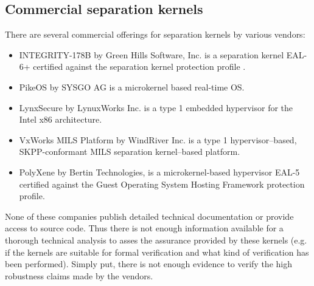 \subsection{Commercial separation kernels}\label{subsec:commercial-sks}
There are several commercial offerings for separation kernels by various
vendors:

\begin{itemize}
	\item INTEGRITY-178B by Green Hills Software, Inc. is a separation kernel
		EAL-6+ certified against the separation kernel protection profile
		\cite{SKPP}.
	\item PikeOS by SYSGO AG is a microkernel based real-time OS.
	\item LynxSecure by LynuxWorks Inc. is a type 1 embedded hypervisor for the
		Intel x86 architecture.
	\item VxWorks MILS Platform by WindRiver Inc. is a type 1 hypervisor–based,
		SKPP-conformant MILS separation kernel–based platform.
	\item PolyXene by Bertin Technologies, is a microkernel-based hypervisor
		EAL-5 certified against the Guest Operating System Hosting Framework
		protection profile.
\end{itemize}

None of these companies publish detailed technical documentation or provide
access to source code. Thus there is not enough information available for a
thorough technical analysis to asses the assurance provided by these kernels
(e.g. if the kernels are suitable for formal verification and what kind of
verification has been performed). Simply put, there is not enough evidence to
verify the high robustness claims made by the vendors.
